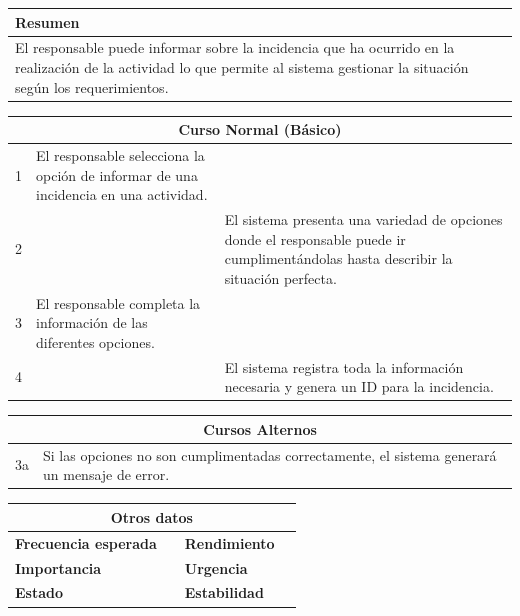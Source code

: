 \begin{table}[h!]
\centering
\begin{tabularx}{\textwidth}{|X|}
\hline
\cellcolor[HTML]{F2F2F2}\textbf{Resumen} \\ \hline
El responsable puede informar sobre la incidencia que ha ocurrido en la realización de la actividad lo que permite al sistema gestionar la situación según los requerimientos. \\ \hline
\end{tabularx}
\end{table}

\vspace{0.2cm}

\begin{table}[h!]
\centering
\begin{tabularx}{\textwidth}{|c|X|X|}
\hline
\multicolumn{3}{|c|}{\cellcolor[HTML]{F2F2F2}\textbf{Curso Normal (Básico)}} \\ \hline
1 & El responsable selecciona la opción de informar de una incidencia en una actividad. & \\ \hline
2 & & El sistema presenta una variedad de opciones donde el responsable puede ir cumplimentándolas hasta describir la situación perfecta. \\ \hline
3 & El responsable completa la información de las diferentes opciones. & \\ \hline
4 & & El sistema registra toda la información necesaria y genera un ID para la incidencia. \\ \hline
\end{tabularx}
\end{table}

\vspace{0.2cm}

\begin{table}[h!]
\centering
\begin{tabularx}{\textwidth}{|c|X|}
\hline
\multicolumn{2}{|c|}{\cellcolor[HTML]{F2F2F2}\textbf{Cursos Alternos}} \\ \hline
3a & Si las opciones no son cumplimentadas correctamente, el sistema generará un mensaje de error. \\ \hline
\end{tabularx}
\end{table}

\vspace{0.2cm}

\begin{table}[h!]
\centering
\begin{tabularx}{\textwidth}{|X|X|X|X|}
\hline
\multicolumn{4}{|c|}{\cellcolor[HTML]{F2F2F2}\textbf{Otros datos}} \\ \hline
\textbf{Frecuencia esperada} &  & \textbf{Rendimiento} &  \\ \hline
\textbf{Importancia} &  & \textbf{Urgencia} &  \\ \hline
\textbf{Estado} & & \textbf{Estabilidad} &  \\ \hline
\end{tabularx}
\end{table}

